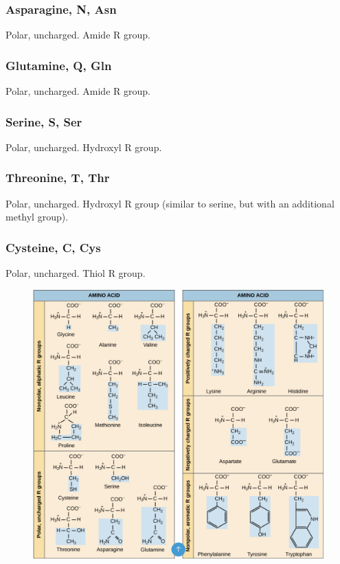 \documentclass[letterpaper, 12pt]{article}
\begin{document}
\subsubsection*{Asparagine, N, Asn}
Polar, uncharged. Amide R group.

\subsubsection*{Glutamine, Q, Gln}
Polar, uncharged. Amide R group.

\subsubsection*{Serine, S, Ser}
Polar, uncharged. Hydroxyl R group.

\subsubsection*{Threonine, T, Thr}
Polar, uncharged. Hydroxyl R group (similar to serine, but with an additional methyl group).

\subsubsection*{Cysteine, C, Cys}
Polar, uncharged. Thiol R group.

\begin{figure}[H]
\centering
\includegraphics[width=\textwidth]{aas_forreal}
\end{figure}
\end{document}
